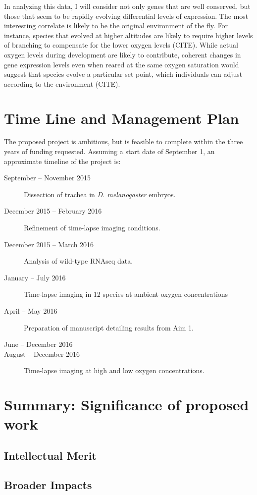 \documentclass{proposal}
\begin{document}
 In analyzing this data, I will consider not only genes that are well conserved, but those that seem to be rapidly evolving differential levels of expression.  The most interesting correlate is likely to be the original environment of the fly.  For instance, species that evolved at higher altitudes are likely to require higher levels of branching to compensate for the lower oxygen levels (CITE).  While actual oxygen levels during development are likely to contribute, coherent changes in gene expression levels even when reared at the same oxygen saturation would suggest that species evolve a particular set point, which individuals can adjust according to the environment (CITE). 


\section{Time Line and Management Plan}

The proposed project is ambitious, but is feasible to complete within the three years of funding requested.  Assuming a start date of September 1, an approximate timeline of the project is: 

\begin{description}
\item[September -- November 2015] Dissection of trachea in {\em D. melanogaster} embryos.  

\item[December 2015 -- February 2016] Refinement of time-lapse imaging conditions. 

\item[December 2015 -- March 2016] Analysis of wild-type RNAseq data. 

\item[January -- July 2016] Time-lapse imaging in 12 species at ambient oxygen concentrations

\item[April -- May 2016] Preparation of manuscript detailing results from Aim 1.

\item[June -- December 2016] 

\item[August -- December 2016] Time-lapse imaging at high and low oxygen concentrations.


\item[]  

\end{description}



\section{Summary:  Significance of proposed work}

\subsection{Intellectual Merit}

\subsection{Broader Impacts}



\newpage
{}
\renewcommand{\thepage} {E--\arabic{page}}



\end{document}
